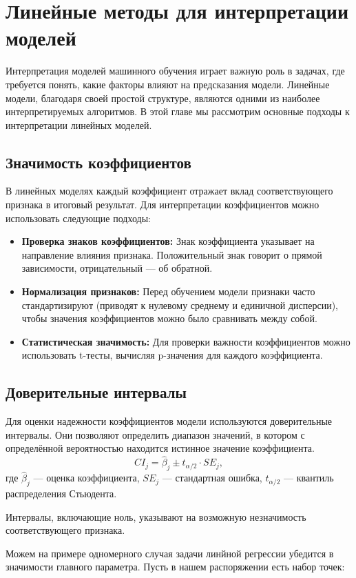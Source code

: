 \section{Линейные методы для интерпретации моделей}

Интерпретация моделей машинного обучения играет важную роль в задачах, где требуется понять, какие факторы влияют на предсказания модели. Линейные модели, благодаря своей простой структуре, являются одними из наиболее интерпретируемых алгоритмов. В этой главе мы рассмотрим основные подходы к интерпретации линейных моделей.

\subsection*{Значимость коэффициентов}
В линейных моделях каждый коэффициент отражает вклад соответствующего признака в итоговый результат. Для интерпретации коэффициентов можно использовать следующие подходы:
\begin{itemize}
    \item \textbf{Проверка знаков коэффициентов:} Знак коэффициента указывает на направление влияния признака. Положительный знак говорит о прямой зависимости, отрицательный --- об обратной.
    \item \textbf{Нормализация признаков:} Перед обучением модели признаки часто стандартизируют (приводят к нулевому среднему и единичной дисперсии), чтобы значения коэффициентов можно было сравнивать между собой.
    \item \textbf{Статистическая значимость:} Для проверки важности коэффициентов можно использовать t-тесты, вычисляя p-значения для каждого коэффициента.
\end{itemize}

\subsection*{Доверительные интервалы}
Для оценки надежности коэффициентов модели используются доверительные интервалы. Они позволяют определить диапазон значений, в котором с определённой вероятностью находится истинное значение коэффициента.
\[
CI_j = \hat{\beta}_j \pm t_{\alpha/2} \cdot SE_j,
\]
где $\hat{\beta}_j$ --- оценка коэффициента, $SE_j$ --- стандартная ошибка, $t_{\alpha/2}$ --- квантиль распределения Стьюдента.

Интервалы, включающие ноль, указывают на возможную незначимость соответствующего признака.

Можем на примере одномерного случая задачи линйной регрессии убедится в значимости главного параметра. Пусть в нашем распоряжении есть набор точек:

